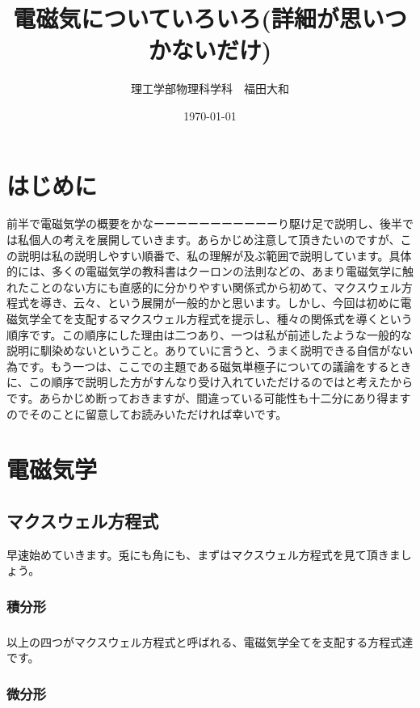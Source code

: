 \documentclass[11pt,b5paper,papersize,dvipdfmx]{jsarticle}
\title{電磁気についていろいろ(詳細が思いつかないだけ)} %
\author{理工学部物理科学科　福田大和} %
\date{\today} %
\begin{document}
\maketitle %
\setcounter{tocdepth}{2} %
\tableofcontents %

\clearpage %

\section{はじめに}
前半で電磁気学の概要をかなーーーーーーーーーーーり駆け足で説明し、後半では私個人の考えを展開していきます。あらかじめ注意して頂きたいのですが、この説明は私の説明しやすい順番で、私の理解が及ぶ範囲で説明しています。具体的には、多くの電磁気学の教科書はクーロンの法則などの、あまり電磁気学に触れたことのない方にも直感的に分かりやすい関係式から初めて、マクスウェル方程式を導き、云々、という展開が一般的かと思います。しかし、今回は初めに電磁気学全てを支配するマクスウェル方程式を提示し、種々の関係式を導くという順序です。この順序にした理由は二つあり、一つは私が前述したような一般的な説明に馴染めないということ。ありていに言うと、うまく説明できる自信がない為です。もう一つは、ここでの主題である磁気単極子についての議論をするときに、この順序で説明した方がすんなり受け入れていただけるのではと考えたからです。あらかじめ断っておきますが、間違っている可能性も十二分にあり得ますのでそのことに留意してお読みいただければ幸いです。

\section{電磁気学}
\subsection{マクスウェル方程式}
早速始めていきます。兎にも角にも、まずはマクスウェル方程式を見て頂きましょう。
\subsubsection{積分形}
\begin{align}

\end{align}
以上の四つがマクスウェル方程式と呼ばれる、電磁気学全てを支配する方程式達です。

\subsubsection{微分形}
\end{document}
